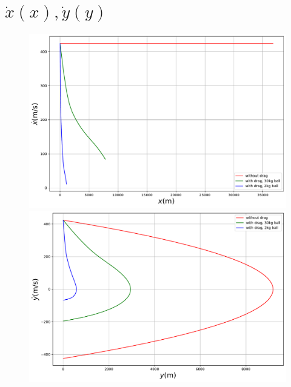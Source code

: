 \documentclass[a4paper,12pt]{article}
\begin{document}
	\section{$\dot{x}(x),\dot{y}(y)$}
	\begin{figure}[h]
		\centering
		\includegraphics[width=0.87\linewidth]{../figures/xvx}
		\includegraphics[width=0.87\linewidth]{../figures/yvy}
	\end{figure}
\end{document}
